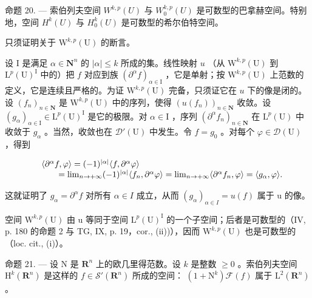 命题 20. — 索伯列夫空间 \(W^{k,p}(U)\) 与 \(W_{0}^{k,p}(U)\) 是可数型的巴拿赫空间。特别地，空间 \(H^{k}(U)\) 与 \(H_{0}^{k}(U)\) 是可数型的希尔伯特空间。

只须证明关于 \(\mathrm{W}^{k,p}(\mathrm{U})\) 的断言。

设 I 是满足 \(\alpha \in \mathbf{N}^n\) 的 \(|\alpha| \leqslant k\) 所成的集。线性映射 \(u\) （从 \(\mathrm{W}^{k,p}(\mathrm{U})\) 到 \(\mathrm{L}^p (\mathrm{U})^{\mathrm{I}}\) 中的）把 \(f\) 对应到族 \((\partial^{\alpha}f)_{\alpha \in \mathrm{I}}\) ，它是单射；按 \(\mathrm{W}^{k,p}(\mathrm{U})\) 上范数的定义，它是连续且严格的。为证 \(\mathrm{W}^{k,p}(\mathrm{U})\) 完备，只须证它在 \(u\) 下的像是闭的。设 \((f_n)_{n \in \mathbf{N}}\) 是 \(\mathrm{W}^{k,p}(\mathrm{U})\) 中的序列，使得 \((u(f_n))_{n \in \mathbf{N}}\) 收敛。设 \((g_{\alpha})_{\alpha \in \mathrm{I}} \in \mathrm{L}^p (\mathrm{U})^{\mathrm{I}}\) 是它的极限。对 \(\alpha \in \mathrm{I}\) ，序列 \((\partial^{\alpha}f_n)_{n \in \mathbf{N}}\) 在 \(\mathrm{L}^p (\mathrm{U})\) 中收敛于 \(g_{\alpha}\) 。当然，收敛也在 \(\mathcal{D}'(\mathrm{U})\) 中发生。令 \(f = g_0\) 。对每个 \(\varphi \in \mathcal{D}(\mathrm{U})\) ，得到

\[
\begin{array}{r l} & {\langle \partial^ {\alpha} f, \varphi \rangle = (- 1) ^ {| \alpha |} \langle f, \partial^ {\alpha} \varphi \rangle} \\ & {\qquad = \lim _ {n \to + \infty} (- 1) ^ {| \alpha |} \langle f _ {n}, \partial^ {\alpha} \varphi \rangle = \lim _ {n \to + \infty} \langle \partial^ {\alpha} f _ {n}, \varphi \rangle = \langle g _ {\alpha}, \varphi \rangle .} \end{array}
\]

这就证明了 \(g_{\alpha} = \partial^{\alpha} f\) 对所有 \(\alpha \in I\) 成立，从而 \((g_{\alpha})_{\alpha \in I} = u(f)\) 属于 u 的像。

空间 \(\mathrm{W}^{k,p}(\mathrm{U})\) 由 u 等同于空间 \(\mathrm{L}^{p}(\mathrm{U})^{\mathrm{I}}\) 的一个子空间；后者是可数型的（IV, p. 180 的命题 2 与 TG, IX, p. 19，cor., (ii))），因而 \(\mathrm{W}^{k,p}(\mathrm{U})\) 也是可数型的（loc. cit., (i)）。

命题 21. --- 设 N 是 \(\mathbf{R}^{n}\) 上的欧几里得范数。设 \(k\) 是整数 \(\geqslant 0\) 。索伯列夫空间 \(\mathrm{H}^{k}(\mathbf{R}^{n})\) 是这样的 \(f \in \mathcal{S}'(\mathbf{R}^{n})\) 所成的空间： \((1 + \mathrm{N}^{k})\mathcal{F}(f)\) 属于 \(\mathrm{L}^{2}(\mathbf{R}^{n})\) 。

